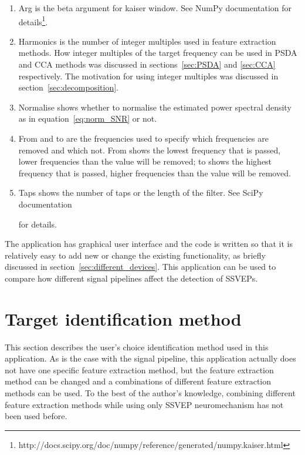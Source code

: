 \begin{enumerate}
	\item Arg is the beta argument for kaiser window. See NumPy documentation for details\footnote{http://docs.scipy.org/doc/numpy/reference/generated/numpy.kaiser.html}.
	\item Harmonics is the number of integer multiples used in \gls{feature extraction} methods. How integer multiples of the \gls{target} frequency can be used in \gls{PSDA} and \gls{CCA} methods was discussed in sections~\ref{sec:PSDA} and \ref{sec:CCA} respectively. The motivation for using integer multiples was discussed in section~\ref{sec:decomposition}.
	\item Normalise shows whether to normalise the estimated \gls{power spectral density} as in equation~\ref{eq:norm_SNR} or not.
	\item From and to are the frequencies used to specify which frequencies are removed and which not. From shows the lowest frequency that is passed, lower frequencies than the value will be removed; to shows the highest frequency that is passed, higher frequencies than the value will be removed.
	\item Taps shows the number of taps or the length of the filter. See SciPy documentation\addtocounter{footnote}{-2}\footnotemark\addtocounter{footnote}{1} for details.
\end{enumerate}

The application has graphical user interface and the code is written so that it is relatively easy to add new or change the existing functionality, as briefly discussed in section~\ref{sec:different_devices}. This application can be used to compare how different signal pipelines affect the detection of \glspl{SSVEP}.

\section{Target identification method}
\label{sec:identification}

This section describes the user's choice identification method used in this application. As is the case with the signal pipeline, this application actually does not have one specific \gls{feature extraction} method, but the \gls{feature extraction} method can be changed and a combinations of different \gls{feature extraction} methods can be used. To the best of the author's knowledge, combining different \gls{feature extraction} methods while using only \gls{SSVEP} neuromechanism has not been used before.

